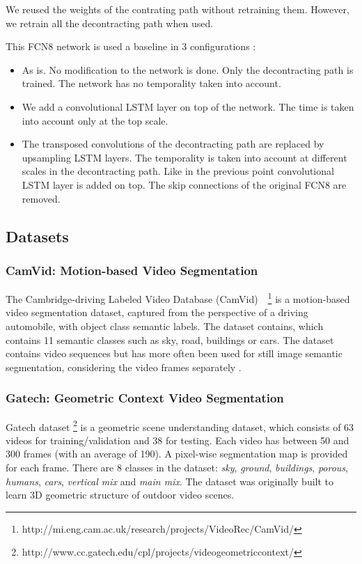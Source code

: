 We reused the weights of the contrating path without retraining them. However,
we retrain all the decontracting path when used.

This FCN8 network is used a baseline in 3 configurations :
\begin{itemize}
    \item As is. No modification to the network is done. Only the decontracting
        path is trained. The network has no temporality taken into account.
    \item We add a convolutional LSTM layer on top of the network. The time is
        taken into account only at the top scale.
    \item The transposed convolutions of the decontracting path are replaced by
        upsampling LSTM layers. The temporality is taken into account at
        different scales in the decontracting path. Like in the previous point
        convolutional LSTM layer is added on top. The skip connections of the
        original FCN8 are removed.
\end{itemize}


\subsection{Datasets}

\subsubsection{CamVid: Motion-based Video Segmentation}
The Cambridge-driving Labeled Video Database (CamVid)~\cite{
Brostow2010semantic}~\footnote{http://mi.eng.cam.ac.uk/research/projects/VideoRec/CamVid/}
is a motion-based video segmentation dataset, captured
from the perspective of a driving automobile, with object class semantic
labels. The dataset contains, which contains 11 semantic classes such as sky,
road, buildings or cars. The dataset contains video sequences but has more
often been used for still image semantic segmentation, considering the video
frames separately \cite{}.

\subsubsection{Gatech: Geometric Context Video Segmentation}
\label{sssec:gatech}
Gatech dataset
\footnote{http://www.cc.gatech.edu/cpl/projects/videogeometriccontext/}
\cite{VideoGeometricContext2013} is a geometric scene understanding dataset,
which consists of 63 videos for training/validation and 38 for testing. Each
video has between 50 and 300 frames (with an average of 190). A pixel-wise
segmentation map is provided for each frame. There are 8 classes in the
dataset: \textit{sky}, \textit{ground}, \textit{buildings}, \textit{porous},
\textit{humans}, \textit{cars}, \textit{vertical mix} and \textit{main mix}.
The dataset was originally built to learn 3D geometric structure of outdoor
video scenes.


